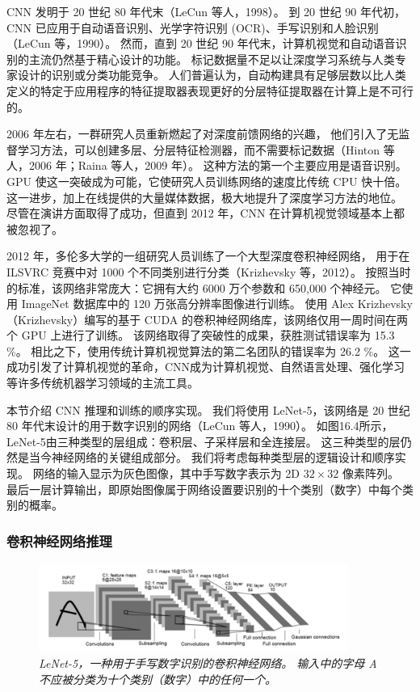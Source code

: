 CNN 发明于 20 世纪 80 年代末（LeCun 等人，1998）。 
到 20 世纪 90 年代初，CNN 已应用于自动语音识别、光学字符识别 (OCR)、手写识别和人脸识别（LeCun 等，1990）。 
然而，直到 20 世纪 90 年代末，计算机视觉和自动语音识别的主流仍然基于精心设计的功能。 
标记数据量不足以让深度学习系统与人类专家设计的识别或分类功能竞争。 
人们普遍认为，自动构建具有足够层数以比人类定义的特定于应用程序的特征提取器表现更好的分层特征提取器在计算上是不可行的。

2006 年左右，一群研究人员重新燃起了对深度前馈网络的兴趣，
他们引入了无监督学习方法，可以创建多层、分层特征检测器，而不需要标记数据（Hinton 等人，2006 年；Raina 等人，2009 年）。 
这种方法的第一个主要应用是语音识别。 GPU 使这一突破成为可能，它使研究人员训练网络的速度比传统 CPU 快十倍。 
这一进步，加上在线提供的大量媒体数据，极大地提升了深度学习方法的地位。 
尽管在演讲方面取得了成功，但直到 2012 年，CNN 在计算机视觉领域基本上都被忽视了。

2012 年，多伦多大学的一组研究人员训练了一个大型深度卷积神经网络，
用于在 ILSVRC 竞赛中对 1000 个不同类别进行分类（Krizhevsky 等，2012）。 
按照当时的标准，该网络非常庞大：它拥有大约 6000 万个参数和 650,000 个神经元。 
它使用 ImageNet 数据库中的 120 万张高分辨率图像进行训练。 
使用 Alex Krizhevsky（Krizhevsky）编写的基于 CUDA 的卷积神经网络库，该网络仅用一周时间在两个 GPU 上进行了训练。 
该网络取得了突破性的成果，获胜测试错误率为 15.3 \%。 
相比之下，使用传统计算机视觉算法的第二名团队的错误率为 26.2 \%。 
这一成功引发了计算机视觉的革命，CNN成为计算机视觉、自然语言处理、强化学习等许多传统机器学习领域的主流工具。

本节介绍 CNN 推理和训练的顺序实现。 
我们将使用 LeNet-5，该网络是 20 世纪 80 年代末设计的用于数字识别的网络（LeCun 等人，1990）。 
如图16.4所示，LeNet-5由三种类型的层组成：卷积层、子采样层和全连接层。 这三种类型的层仍然是当今神经网络的关键组成部分。 
我们将考虑每种类型层的逻辑设计和顺序实现。 网络的输入显示为灰色图像，其中手写数字表示为 2D $32 \times 32$ 像素阵列。 
最后一层计算输出，即原始图像属于网络设置要识别的十个类别（数字）中每个类别的概率。

\subsubsection{卷积神经网络推理}
\begin{figure}[H]
	\centering
	\includegraphics[width=0.9\textwidth]{figs/F16.4.png}
	\caption{\textit{LeNet-5，一种用于手写数字识别的卷积神经网络。 
	输入中的字母 A 不应被分类为十个类别（数字）中的任何一个。}}
\end{figure}

